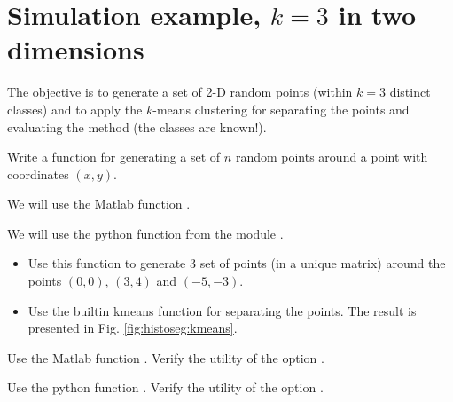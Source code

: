 \section{Simulation example, $k=3$ in two dimensions}

\vspace*{-6pt}%

The objective is to generate a set of 2-D random points (within $k=3$ distinct classes) and to apply the $k$-means clustering for separating the points and evaluating the method (the classes are known!).
\begin{qbox}
Write a function for generating a set of $n$ random points around a point with coordinates $(x,y)$.
 \end{qbox}

\vspace*{-4pt}

\begin{mcomment}
\begin{mremark}We will use the Matlab function .\end{mremark}
\end{mcomment}
\begin{pcomment}
\begin{premark}We will use the python function  from the module .
\end{premark}
\end{pcomment}
 
\begin{qbox}
\begin{itemize}
\item Use this function to generate 3 set of points (in a unique matrix) around the points $(0,0)$, $(3,4)$ and $(-5,-3)$.

\item Use the builtin kmeans function for separating the points. The result is presented in Fig. \ref{fig:histoseg:kmeans}.


\end{itemize}
 \end{qbox} 
 
\begin{mcomment}
\begin{mremark}Use the Matlab function . Verify the utility of the option .  
\end{mremark}
\end{mcomment}
\begin{pcomment}
\begin{premark}Use the python function . 
Verify the utility of the option .
\end{premark}
\end{pcomment}

